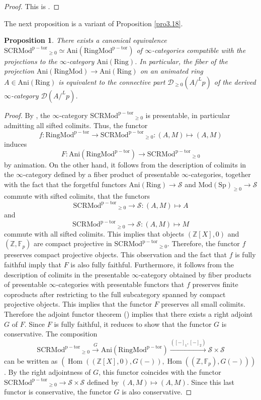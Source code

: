 \documentclass[11pt, a4paper]{amsart}
\theoremstyle{plain}
\newtheorem{prop}[theorem]{Proposition}
\theoremstyle{definition}
\begin{document}
\begin{proof}
    This is \cite[Proposition 25.2.1.2]{Lur18}.
\end{proof}
The next proposition is a variant of Proposition \ref{pro3.18}.
\begin{prop}\label{pro3.19}
     There exists a canonical equivalence $\operatorname{SCRMod^{p-tor}}_{\ge0}\simeq \operatorname{Ani(RingMod^{p-tor})}$ of $\infty$-categories compatible with the projections to the $\infty$-category $\operatorname{Ani(Ring)}$. In particular, the fiber of the projection $\operatorname{Ani(RingMod)}\to \operatorname{Ani(Ring)}$ on an animated ring $A\in \operatorname{Ani(Ring)}$ is equivalent to the connective part $\mathcal D_{\ge0}(A/^Lp)$ of the derived $\infty$-category $\mathcal D(A/^Lp)$.
\end{prop}
\begin{proof}
    By \cite[Proposition. 5.5.3.12]{Lur09}, the $\infty$-category $\operatorname{SCRMod^{p-tor}}_{\ge0}$ is presentable, in particular admitting all sifted colimits. Thus, the functor \[f:\operatorname{RingMod^{p-tor}}\to \operatorname{SCRMod^{p-tor}}_{\ge0}:(A,M)\mapsto (A,M)\] induces \[F:\operatorname{Ani(RingMod^{p-tor})}\to \operatorname{SCRMod^{p-tor}}_{\ge0}\] by animation. 
    On the other hand, it follows from the description of colimits in the $\infty$-category defined by a fiber product of presentable $\infty$-categories, together with the fact that the forgetful functors $\operatorname{Ani(Ring)}\to \mathcal S$ and $\operatorname{Mod(Sp)}_{\ge0}\to \mathcal S$ commute with sifted colimits, that the functors \[\operatorname{SCRMod^{p-tor}}_{\ge0}\to \mathcal S:(A,M)\mapsto A\] and \[\operatorname{SCRMod^{p-tor}}_{\ge0}\to \mathcal S:(A,M)\mapsto M\] commute with all sifted colimits. This implies that objects $(\mathbb Z[X],0)$ and $(\mathbb Z,\mathbb F_p)$ are compact projective in $\operatorname{SCRMod^{p-tor}}_{\ge0}$. Therefore, the functor $f$ preserves compact projective objects. This observation and the fact that $f$ is fully faithful imply that $F$ is also fully faithful. Furthermore, it follows from  the description of colimits in the presentable $\infty$-category obtained by fiber products of presentable $\infty$-categories with presentable functors that $f$ preserves finite coproducts after restricting to the full subcategory spanned by compact projective objects. This implies that the functor $F$ preserves all small colimits. Therefore the adjoint functor theorem (\cite[Corollary 5.5.2.9]{Lur09}) implies that there exists a right adjoint $G$ of $F$. Since $F$ is fully faithful, it reduces to show that the functor $G$ is conservative. The composition \[\operatorname{SCRMod^{p-tor}}_{\ge0}\xrightarrow[]{G}\operatorname{Ani(RingMod^{p-tor})}\xrightarrow[]{([-]_1,[-]_2)}\mathcal S\times \mathcal S\] can be written as $(\operatorname{Hom}((\mathbb Z[X],0),G(-)),\operatorname{Hom}((\mathbb Z,\mathbb F_p),G(-)))$. By the right adjointness of $G$, this functor coincides with the functor $\operatorname{SCRMod^{p-tor}}_{\ge0}\to \mathcal S\times\mathcal S$ defined by $(A,M)\mapsto (A,M)$. Since this last functor is conservative, the functor $G$ is also conservative.  


\end{proof}
\end{document}
